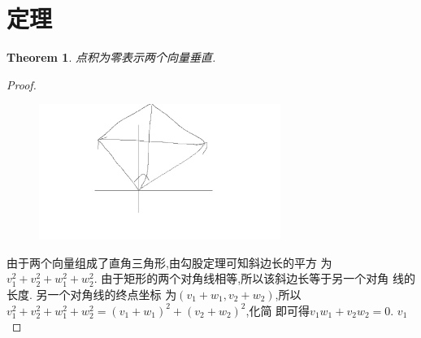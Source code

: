 \documentclass[UTF-8]{ctexart}
\newtheorem{theorem}{Theorem}[section]
\newtheorem{proof}{Proof}[section]
\begin{document}
\section{定理}

\begin{theorem}
  点积为零表示两个向量垂直.

\end{theorem}
\begin{proof}
  \begin{figure}[H] %
    \centering %
    \includegraphics[width=0.7\textwidth]{images/math/1.jpg} %
  \end{figure}
  由于两个向量组成了直角三角形,由勾股定理可知斜边长的平方
  为$v_1^2+v_2^2+w_1^2+w_2^2$. 由于矩形的两个对角线相等,所以该斜边长等于另一个对角
  线的长度. 另一个对角线的终点坐标
  为$(v_1+w_1,v_2+w_2)$,所以$v_1^2+v_2^2+w_1^2+w_2^2=(v_1+w_1)^2+(v_2+w_2)^2$,化简
  即可得$v_1w_1+v_2w_2=0$. $v_1$	
\end{proof}
\end{document}

